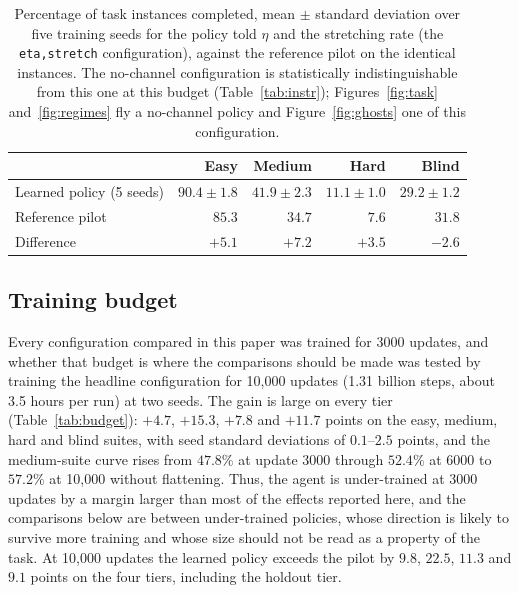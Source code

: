 \documentclass[11pt]{article}
\newcommand{\code}[1]{\texttt{\small #1}}
\begin{document}
\begin{table}[t]
\centering
\small
\begin{tabular}{lrrrr}
\toprule
& Easy & Medium & Hard & Blind \\
\midrule
Learned policy (5 seeds) & $90.4 \pm 1.8$ & $41.9 \pm 2.3$ & $11.1 \pm 1.0$ & $29.2 \pm 1.2$ \\
Reference pilot          & $85.3$ & $34.7$ & $7.6$ & $31.8$ \\
\midrule
Difference               & $+5.1$ & $+7.2$ & $+3.5$ & $-2.6$ \\
\bottomrule
\end{tabular}
\caption{Percentage of task instances completed, mean $\pm$ standard
deviation over five training seeds for the policy told $\eta$ and the
stretching rate (the \code{eta,stretch} configuration), against the
reference pilot on the identical instances. The no-channel configuration is
statistically indistinguishable from this one at this budget
(Table~\ref{tab:instr}); Figures~\ref{fig:task} and~\ref{fig:regimes} fly
a no-channel policy and Figure~\ref{fig:ghosts} one of this configuration.}
\label{tab:main}
\end{table}

\subsection{Training budget}
\label{sec:budget}

Every configuration compared in this paper was trained for 3000 updates,
and whether that budget is where the comparisons should be made was tested
by training the headline configuration for 10,000 updates (1.31 billion
steps, about 3.5 hours per run) at two seeds. The gain is large on every
tier (Table~\ref{tab:budget}): $+4.7$, $+15.3$, $+7.8$ and $+11.7$ points on
the easy, medium, hard and blind suites, with seed standard deviations of
$0.1$--$2.5$ points, and the medium-suite curve rises from $47.8\%$ at
update 3000 through $52.4\%$ at 6000 to $57.2\%$ at 10,000 without
flattening. Thus, the agent is under-trained at 3000 updates by a margin
larger than most of the effects reported here, and the comparisons below
are between under-trained policies, whose direction is likely to survive
more training and whose size should not be read as a property of the
task. At 10,000
updates the learned policy exceeds the pilot by $9.8$, $22.5$, $11.3$ and
$9.1$ points on the four tiers, including the holdout tier.
\end{document}
